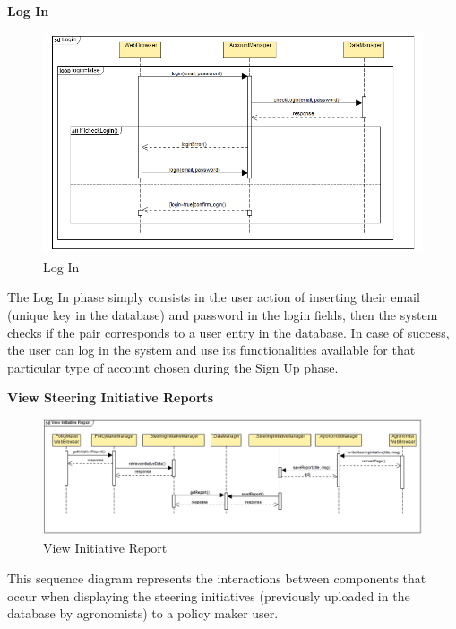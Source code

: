 \documentclass[table, 12pt]{article}
\begin{document}
\newpage
\textbf{Log In}
\begin{center}
    \begin{figure}[H]
        \includegraphics[scale=0.8, center]{assets/SequenceDiagram/Login.png}
        \caption{Log In}
        \label{fig: login}
    \end{figure}
\end{center}

The Log In phase simply consists in the user action of inserting their email (unique key in the database) and password in the login fields, then the system checks if the pair corresponds to a user entry in the database.
In case of success, the user can log in the system and use its functionalities available for that particular type of account chosen during the Sign Up phase.

\newpage
\textbf{View Steering Initiative Reports}
\begin{center}
    \begin{figure}[H]
        \includegraphics[scale=0.70, center]{assets/SequenceDiagram/ViewInitiativeReport.png}
        \caption{View Initiative Report}
        \label{fig: report}
    \end{figure}
\end{center}
This sequence diagram represents the interactions between components that occur when displaying the steering initiatives (previously uploaded in the database by agronomists) to a policy maker user.
\end{document}
